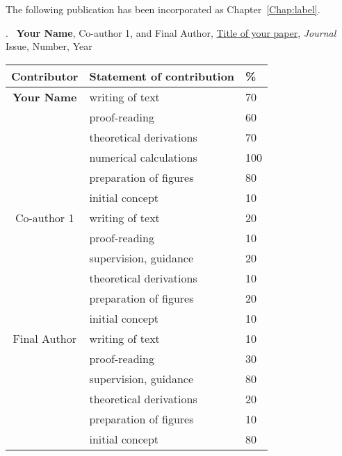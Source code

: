 \cleartoevenpage

\noindent
The following publication has been incorporated as Chapter~\ref{Chap:label}.

.~\cite{DumyCitationKey} \textbf{Your Name}, Co-author 1, and Final Author, \href{linktoyourpaper}{Title of your paper}, \textit{Journal} Issue, Number, Year

\begin{table}[h]
	\begin{center}
	\begin{tabular}{|c|l|l|}
		\hline
		Contributor & Statement of contribution & \% \\
		\hline
		\textbf{Your Name}				& writing of text 					& 70\\
															& proof-reading							& 60 \\
															& theoretical derivations 	& 70\\
															& numerical calculations 		& 100\\
															& preparation of figures 		& 80 \\
															& initial concept						& 10 \\
		\hline
		Co-author 1								& writing of text 					& 20\\
															& proof-reading							& 10 \\
															& supervision, guidance 		& 20\\
															& theoretical derivations 	& 10\\
															& preparation of figures 		& 20 \\
															& initial concept						& 10 \\
		\hline
		Final Author							& writing of text 					& 10\\
															& proof-reading							& 30 \\
															& supervision, guidance 		& 80 \\
															& theoretical derivations 	& 20 \\
															& preparation of figures 		& 10 \\
															& initial concept						& 80 \\
		\hline
	\end{tabular}
	\end{center}
\end{table}

